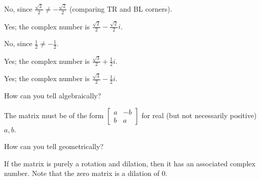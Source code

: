 \documentclass[../key.tex]{subfiles}
\begin{document}
No, since $\frac{\sqrt{2}}{2} \neq -\frac{\sqrt{2}}{2}$ (comparing TR and BL corners).

\begin{iinner_problem}
\item {}
\end{iinner_problem}

Yes; the complex number is $\frac{\sqrt{2}}{2} - \frac{\sqrt{2}}{2}i$.

\begin{iinner_problem}
\item {}
\end{iinner_problem}

No, since $\frac{1}{2} \neq -\frac{1}{2}$.

\begin{iinner_problem}
\item {}
\end{iinner_problem}

Yes; the complex number is $\frac{\sqrt{3}}{2} + \frac{1}{2}i$.

\begin{iinner_problem}
\item {}
\end{iinner_problem}

Yes; the complex number is $\frac{\sqrt{3}}{2} - \frac{1}{2}i$.

\begin{inner_problem}
\item How can you tell algebraically?
\end{inner_problem}

The matrix must be of the form $\begin{bmatrix} a & -b \\ b & a \end{bmatrix}$ for real (but not necessarily positive) $a,b$.

\begin{inner_problem}
\item How can you tell geometrically?
\end{inner_problem}

If the matrix is purely a rotation and dilation, then it has an associated complex number. Note that the zero matrix is a dilation of $0$.
\end{document}
